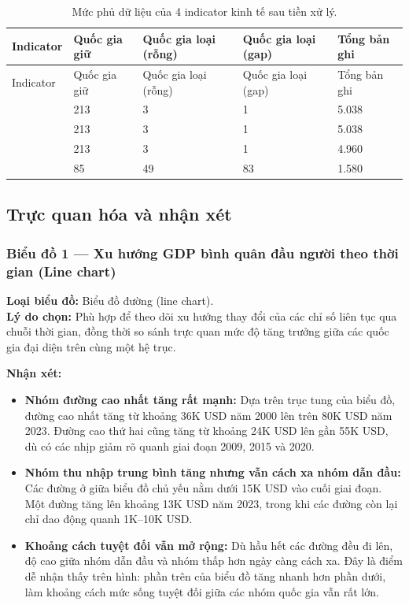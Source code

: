 \begin{longtable}{L{3.8cm}L{2.5cm}L{2.5cm}L{2.5cm}L{2.5cm}}
\caption{Mức phủ dữ liệu của 4 indicator kinh tế sau tiền xử lý.}
\label{tab:econ-coverage}\\
\toprule
Indicator & Quốc gia giữ & Quốc gia loại (rỗng) & Quốc gia loại (gap) & Tổng bản ghi \\
\midrule
\endfirsthead
\toprule
Indicator & Quốc gia giữ & Quốc gia loại (rỗng) & Quốc gia loại (gap) & Tổng bản ghi \\
\midrule
\endhead
{} & 213 & 3 & 1 & 5.038 \\
 & 213 & 3 & 1 & 5.038 \\
 & 213 & 3 & 1 & 4.960 \\
 & 85 & 49 & 83 & 1.580 \\
\bottomrule
\end{longtable}

\subsection{Trực quan hóa và nhận xét}

\subsubsection{Biểu đồ 1 --- Xu hướng GDP bình quân đầu người theo thời gian (Line chart)}

\textbf{Loại biểu đồ:} Biểu đồ đường (line chart).\\
\textbf{Lý do chọn:} Phù hợp để theo dõi xu hướng thay đổi của các chỉ số liên tục qua chuỗi thời gian, đồng thời so sánh trực quan mức độ tăng trưởng giữa các quốc gia đại diện trên cùng một hệ trục.


\textbf{Nhận xét:}
\begin{itemize}
    \item \textbf{Nhóm đường cao nhất tăng rất mạnh:} Dựa trên trục tung của biểu đồ, đường cao nhất tăng từ khoảng 36K USD năm 2000 lên trên 80K USD năm 2023. Đường cao thứ hai cũng tăng từ khoảng 24K USD lên gần 55K USD, dù có các nhịp giảm rõ quanh giai đoạn 2009, 2015 và 2020.
    \item \textbf{Nhóm thu nhập trung bình tăng nhưng vẫn cách xa nhóm dẫn đầu:} Các đường ở giữa biểu đồ chủ yếu nằm dưới 15K USD vào cuối giai đoạn. Một đường tăng lên khoảng 13K USD năm 2023, trong khi các đường còn lại chỉ dao động quanh 1K--10K USD.
    \item \textbf{Khoảng cách tuyệt đối vẫn mở rộng:} Dù hầu hết các đường đều đi lên, độ cao giữa nhóm dẫn đầu và nhóm thấp hơn ngày càng cách xa. Đây là điểm dễ nhận thấy trên hình: phần trên của biểu đồ tăng nhanh hơn phần dưới, làm khoảng cách mức sống tuyệt đối giữa các nhóm quốc gia vẫn rất lớn.
\end{itemize}

